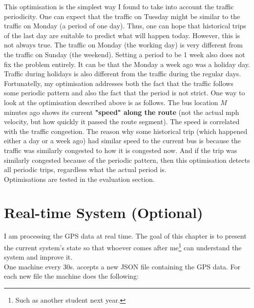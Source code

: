 \documentclass[12pt,a4paper,oneside,openright]{report}
\begin{document}
This optimisation is the simplest way I found to take into account the traffic
periodicity. One can expect that the traffic on Tuesday might be similar to the
traffic on Monday (a period of one day). Thus, one can hope that historical trips
of the last day are suitable to predict what will happen today. However,
this is not always true. The traffic on Monday (the working day) is very different
from the traffic on Sunday (the weekend). Setting a period to be 1 week also does not
fix the problem entirely. It can be that the Monday a week ago was a holiday day.
Traffic during holidays is also different from the traffic during the regular days. \\

Fortunatelly, my optimisation addresses both the fact that the traffic follows some
periodic pattern and also the fact that the period is not strict. One way to look at
the optimisation described above is as follows. The bus location $M$ minutes ago shows
its current \textbf{"speed" along the route} (not the actual mph velocity, but how
quickly it passed the route segment). The speed is correlated with the traffic
congestion. The reason why some historical trip (which happened either a day or a week
ago) had similar speed to the current bus is because the traffic was similarly
congested to how it is congested now. And if the trip was similarly congested because
of the periodic pattern, then this optimisation detects all periodic trips, regardless
what the actual period is. \\

Optimisations are tested in the evaluation section.


\newpage

\section{Real-time System (Optional)}

I am processing the GPS data at real time. The goal of this chapter is to present
the current system's state so that whoever comes after
me\footnote{Such as another student next year.} can understand the system and
improve it. \\

One machine every 30s. accepts a new JSON file containing the GPS data. For each new
file the machine does the following:
\end{document}
